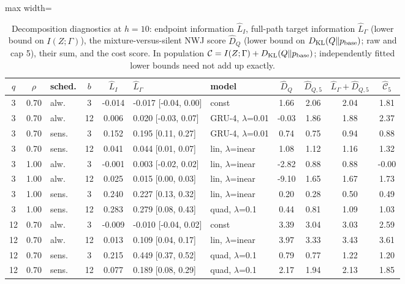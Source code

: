 \documentclass[10pt]{article}
\begin{document}
\begin{table}[htbp]
\centering
\scriptsize
\caption{Decomposition diagnostics at $h=10$: endpoint information $\widehat L_I$, full-path target information $\widehat L_\Gamma$ (lower bound on $I(Z;\Gamma)$), the mixture-versus-silent NWJ score $\widehat D_Q$ (lower bound on $D_{\rm KL}(Q\Vert p_{\rm base})$; raw and cap 5), their sum, and the cost score. In population $\mathcal C = I(Z;\Gamma)+D_{\rm KL}(Q\Vert p_{\rm base})$; independently fitted lower bounds need not add up exactly.}\label{tab:decomposition}
\begin{adjustbox}{max width=\textwidth}
\begin{tabular}{cclc c l l cc cc}
\toprule
$q$ & $\rho$ & sched. & $b$ & $\widehat L_I$ & $\widehat L_{\Gamma}$ & model & $\widehat D_Q$ & $\widehat D_{Q,5}$ & $\widehat L_\Gamma+\widehat D_{Q,5}$ & $\widehat{\mathcal C}_5$ \\
\midrule
3 & 0.70 & alw. & 3 & -0.014 & -0.017 [-0.04, 0.00] & const & 1.66 & 2.06 & 2.04 & 1.81 \\
3 & 0.70 & alw. & 12 & 0.006 & 0.020 [-0.03, 0.07] & GRU-4, $\lambda$=0.01 & -0.03 & 1.86 & 1.88 & 2.37 \\
3 & 0.70 & sens. & 3 & 0.152 & 0.195 [0.11, 0.27] & GRU-4, $\lambda$=0.01 & 0.74 & 0.75 & 0.94 & 0.88 \\
3 & 0.70 & sens. & 12 & 0.041 & 0.044 [0.01, 0.07] & lin, $\lambda$=inear & 1.08 & 1.12 & 1.16 & 1.32 \\
3 & 1.00 & alw. & 3 & -0.001 & 0.003 [-0.02, 0.02] & lin, $\lambda$=inear & -2.82 & 0.88 & 0.88 & -0.00 \\
3 & 1.00 & alw. & 12 & 0.025 & 0.015 [0.00, 0.03] & lin, $\lambda$=inear & -9.10 & 1.65 & 1.67 & 1.73 \\
3 & 1.00 & sens. & 3 & 0.240 & 0.227 [0.13, 0.32] & lin, $\lambda$=inear & 0.20 & 0.28 & 0.50 & 0.49 \\
3 & 1.00 & sens. & 12 & 0.283 & 0.279 [0.08, 0.43] & quad, $\lambda$=0.1 & 0.44 & 0.81 & 1.09 & 1.03 \\
12 & 0.70 & alw. & 3 & -0.009 & -0.010 [-0.04, 0.02] & const & 3.39 & 3.04 & 3.03 & 2.59 \\
12 & 0.70 & alw. & 12 & 0.013 & 0.109 [0.04, 0.17] & lin, $\lambda$=inear & 3.97 & 3.33 & 3.43 & 3.61 \\
12 & 0.70 & sens. & 3 & 0.215 & 0.449 [0.37, 0.52] & quad, $\lambda$=0.1 & 0.79 & 0.77 & 1.22 & 1.20 \\
12 & 0.70 & sens. & 12 & 0.077 & 0.189 [0.08, 0.29] & quad, $\lambda$=0.1 & 2.17 & 1.94 & 2.13 & 1.85 \\

\end{tabular}
\end{adjustbox}
\end{table}
\end{document}
